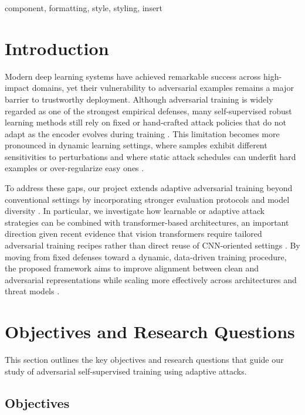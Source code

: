 \documentclass[conference]{IEEEtran}
\begin{document}
\begin{IEEEkeywords}
component, formatting, style, styling, insert
\end{IEEEkeywords}

\section{Introduction}

Modern deep learning systems have achieved remarkable success across high-impact domains, yet their vulnerability to adversarial examples remains a major barrier to trustworthy deployment. Although adversarial training is widely regarded as one of the strongest empirical defenses, many self-supervised robust learning methods still rely on fixed or hand-crafted attack policies that do not adapt as the encoder evolves during training \cite{b1,b2,b3,b4,b5}. This limitation becomes more pronounced in dynamic learning settings, where samples exhibit different sensitivities to perturbations and where static attack schedules can underfit hard examples or over-regularize easy ones \cite{b5}.

To address these gaps, our project extends adaptive adversarial training beyond conventional settings by incorporating stronger evaluation protocols and model diversity \cite{b5}. In particular, we investigate how learnable or adaptive attack strategies can be combined with transformer-based architectures, an important direction given recent evidence that vision transformers require tailored adversarial training recipes rather than direct reuse of CNN-oriented settings \cite{b6}. By moving from fixed defenses toward a dynamic, data-driven training procedure, the proposed framework aims to improve alignment between clean and adversarial representations while scaling more effectively across architectures and threat models \cite{b1,b2,b3}.


\section{Objectives and Research Questions}

This section outlines the key objectives and research questions that guide our study of adversarial self-supervised training using adaptive attacks.

\subsection{Objectives}
\end{document}
